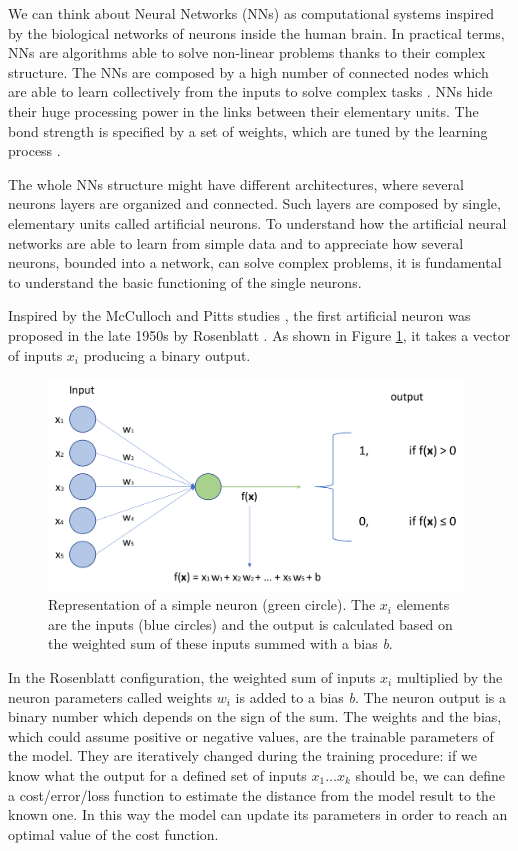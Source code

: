 \documentclass[../main.tex]{subfiles}
\begin{document}
We can think about Neural Networks (NNs) as computational systems inspired by the biological networks of neurons inside the human brain. 
In practical terms, NNs are algorithms able to solve non-linear problems thanks to their complex structure.
The NNs are composed by a high number of connected nodes which are able to learn collectively from the inputs to solve complex tasks \cite{o2015introduction-cnn}.
NNs hide their huge processing power in the links between their elementary units.
The bond strength is  specified by a set of weights, which are tuned by the learning process \cite{gurney2018neural-networks}.

The whole NNs structure might have different architectures, where several neurons layers are organized and connected.
Such layers are composed by single, elementary units called artificial neurons.
To understand how the artificial neural networks are able to learn from simple data and to appreciate how several neurons, bounded into a network, can solve complex problems, it is fundamental to understand the basic functioning of the single neurons.

Inspired by the McCulloch and Pitts studies \cite{mcculloch1943logical-neural-network}, the first artificial neuron was proposed in the late 1950s by Rosenblatt \cite{rosenblatt1958perceptron}.
As shown in Figure \ref{fig:perceptron}, it takes a vector of inputs $x_i$ producing a binary output.

\begin{figure}[H] 
\begin{center}
\includegraphics[width=11cm]{images/Perceptron.png}
\caption{\small{Representation of a simple neuron (green circle). The $x_i$ elements are the inputs (blue circles) and the output is calculated based on the weighted sum of these inputs summed with a bias \textit{b}.}}\label{fig:perceptron}
\end{center}
\end{figure}
In the Rosenblatt configuration, the weighted sum of inputs $x_i$ multiplied by the neuron parameters called weights $w_i$ is added to a bias \textit{b}. 
The neuron output is a binary number which depends on the sign of the sum. 
The weights and the bias, which could assume positive or negative values, are the trainable parameters of the model.
They are iteratively changed during the training procedure: if we know what the output for a defined set of inputs $x_{1} \dots x_k$ should be, we can define a cost/error/loss function to estimate the distance from the model result to the known one. 
In this way the model can update its parameters in order to reach an optimal value of the cost function.
\end{document}

